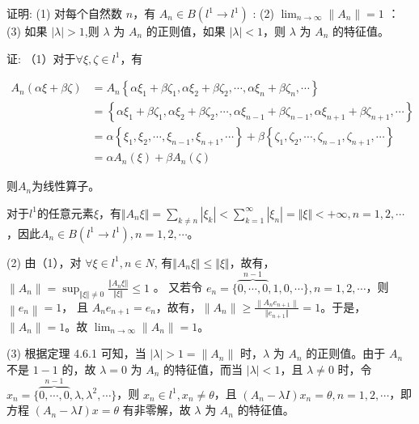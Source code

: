 \documentclass{article}
\begin{document}
\begin{enumerate}
证明: (1) 对每个自然数 $n$，有 $A_n \in B\left(l^1 \rightarrow l^1\right)$ : (2) $\lim _{n \rightarrow \infty}\left\|A_n\right\|=1$ ： (3) 如果 $|\lambda|>1$,则 $\lambda$ 为 $A_n$ 的正则值，如果 $|\lambda|<1$，则 $\lambda$ 为 $A_n$ 的特征值。

证: （1）对于$\forall \xi, \zeta \in l^1$，有

\begin{equation*}
    \begin{aligned}
        A_n(\alpha \xi + \beta \zeta) &= A_n\left\{\alpha \xi_1 + \beta \zeta_1, \alpha \xi_2 + \beta \zeta_2, \cdots, \alpha \xi_{n} + \beta \zeta_{n}, \cdots\right\}\\
        &= \left\{\alpha \xi_1 + \beta \zeta_1, \alpha \xi_2 + \beta \zeta_2, \cdots, \alpha \xi_{n-1} + \beta \zeta_{n-1}, \alpha \xi_{n+1} + \beta \zeta_{n+1}, \cdots\right\}\\
        &=\alpha\left\{\xi_1, \xi_2, \cdots, \xi_{n-1}, \xi_{n+1}, \cdots\right\} + \beta\left\{\zeta_1, \zeta_2, \cdots, \zeta_{n-1}, \zeta_{n+1}, \cdots\right\}\\
        &=\alpha A_n(\xi) + \beta A_n(\zeta)
    \end{aligned}
\end{equation*}

则$A_n$为线性算子。

对于$l^{1}$的任意元素$\xi$，有$\Vert A_n\xi \Vert = \sum_{k\neq n}\left| \xi_k \right| < \sum_{k=1}^{\infty}\left| \xi_n \right| = \Vert \xi \Vert < + \infty, n = 1, 2, \cdots$，因此$A_n \in B\left(l^1 \rightarrow l^1\right), n = 1, 2, \cdots$。

(2) 由（1），对 $\forall \xi \in l^{1}, n \in N$, 有$\Vert A_n\xi \Vert \leq \Vert \xi \Vert$，故有，$\left\|A_n\right\| = \sup_{\Vert \xi \Vert \neq 0} \frac{\Vert A_n \xi \Vert}{\Vert \xi \Vert} \leq 1$ 。 又若令 $e_n=\{\overbrace{0, \cdots, 0}^{n-1}, 1,0, \cdots\}, n=1,2, \cdots$，则 $\left\|e_n\right\|=1$， 且 $A_n e_{n+1}=e_n$，故有，$\left\|A_n\right\| \geq \frac{\left\|A_n e_{n+1}\right\|}{\Vert e_{n+1} \Vert}=1$。于是，$\left\|A_n\right\|=1$。故 $\lim _{n \rightarrow \infty}\left\|A_n\right\|=1$。

(3) 根据定理 4.6.1 可知，当 $|\lambda|>1=\left\|A_n\right\|$ 时，$\lambda$ 为 $A_n$ 的正则值。由于 $A_n$ 不是 $1-1$ 的，故 $\lambda=0$ 为 $A_n$ 的特征值，而当 $|\lambda|<1$，且 $\lambda \neq 0$ 时，令 $x_n=\{\overbrace{0, \cdots, 0}^{n-1}, \lambda, \lambda^2, \cdots\}$，则 $x_n \in l^{1}, x_n \neq \theta$，且 $\left(A_n-\lambda I\right) x_n=\theta, n=1,2, \cdots$，即方程 $\left(A_n-\lambda I\right) x=\theta$ 有非零解，故 $\lambda$ 为 $A_n$ 的特征值。


\end{enumerate}
\end{document}
